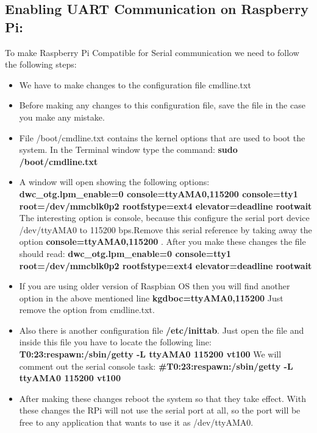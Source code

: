 \documentclass[11pt,a4paper]{article}
\begin{document}
	\subsection{Enabling UART Communication on Raspberry Pi:}
	To make Raspberry Pi Compatible for Serial communication we need to follow the following steps:
	\begin{itemize}
		\item We have to make changes to the configuration file cmdline.txt
		\item Before making any changes to this configuration file, save the file in the case you make any mistake.
		\item File /boot/cmdline.txt contains the kernel options that are used to boot the system.
		\newline In the Terminal window type the command:
		\newline \textbf{sudo /boot/cmdline.txt}
		\item A window will open showing the following options:
		\newline \textbf{dwc\_otg.lpm\_enable=0 console=ttyAMA0,115200 console=tty1 root=/dev/mmcblk0p2 rootfstype=ext4 elevator=deadline rootwait}
		\newline The interesting option is console, because this configure the serial port device /dev/ttyAMA0 to 115200 bps.Remove this serial reference by taking away the option \textbf{console=ttyAMA0,115200 }. After you make these changes the file should read:
		\newline \textbf{dwc\_otg.lpm\_enable=0 console=tty1 root=/dev/mmcblk0p2 rootfstype=ext4 elevator=deadline rootwait}
		\item If you are using older version of Raspbian OS then you will find another option in the above mentioned line \newline \textbf{kgdboc=ttyAMA0,115200}
		\newline Just remove the option from cmdline.txt.
		\item Also there is another configuration file \textbf{/etc/inittab}. Just open the file and inside this file you have to locate the following line: 
		\newline \textbf{T0:23:respawn:/sbin/getty -L ttyAMA0 115200 vt100}
		\newline We will comment out the serial console task:
		\newline \textbf{\#T0:23:respawn:/sbin/getty -L ttyAMA0 115200 vt100}
		\item After making these changes reboot the system so that they take effect. With these changes the RPi will not use the serial port at all, so the port will be free to any application that wants to use it as /dev/ttyAMA0.

\end{itemize}
\end{document}
